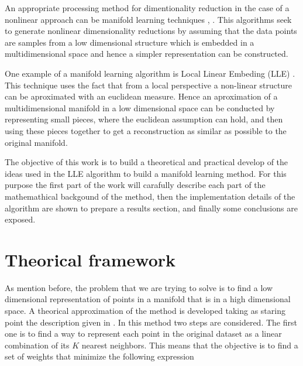 \documentclass[12pt,journal]{IEEEtran}
\begin{document}
\vspace{0.25cm}

An appropriate processing method for dimentionality reduction in the case of
a nonlinear approach can be manifold learning techniques \cite{manifold1},
\cite{manifold2}. This algorithms seek to generate nonlinear dimensionality
reductions by assuming that the data points are samples from a low dimensional
structure which is embedded in a multidimensional space and hence a simpler
representation can be constructed. \cite{manifold}

\vspace{0.25cm}

One example of a manifold learning algorithm is Local Linear Embeding (LLE)
\cite{lle}. This technique uses the fact that from a local perspective a
non-linear structure can be aproximated with an euclidean measure. Hence an
aproximation of a multidimensional manifold in a low dimensional space can be
conducted by representing small pieces, where the euclidean assumption can hold,
and then using these pieces together to get a reconstruction as similar as 
possible to the original manifold.

\vspace{0.25cm}

The objective of this work is to build a theoretical and practical develop of
the ideas used in the LLE algorithm to build a manifold learning method. For
this purpose the first part of the work will carafully describe each part of
the mathemathical backgound of the method, then the implementation details of
the algorithm are shown to prepare a results section, and finally some
conclusions are exposed.

\section{Theorical framework}

    As mention before, the problem that we are trying to solve is to find
    a low dimensional representation of points in a manifold that is in a high
    dimensional space. A theorical approximation of 
    the method is developed taking as staring point the description given in
    \cite{proof}. In this method two steps are considered. The
    first one is to find a way to represent each point in the original dataset as
    a linear combination of its $K$ nearest neighbors. This means that the
    objective is to find a set of weights that minimize the following
    expression
\end{document}
